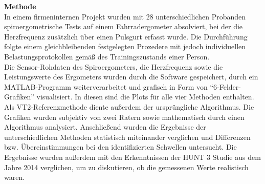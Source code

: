 \textbf{\Large Methode}\\

In einem firmeninternen Projekt wurden mit 28 unterschiedlichen Probanden spiroergometrische Tests auf einem Fahrradergometer absolviert, bei der die Herzfrequenz zusätzlich über einen Pulsgurt erfasst wurde. Die Durchführung folgte einem gleichbleibenden festgelegten Prozedere mit jedoch individuellen Belastungsprotokollen gemäß des Trainingszustands einer Person.\\
Die Sensor-Rohdaten des Spiroergometers, die Herzfrequenz sowie die Leistungswerte des Ergometers wurden durch die Software gespeichert, durch ein MATLAB-Programm weiterverarbeitet und grafisch in Form von "`6-Felder-Grafiken"' visualisiert. In diesen sind die Plots für alle vier Methoden enthalten. Als VT2-Referenzmethode diente außerdem der ursprüngliche Algorithmus. Die Grafiken wurden subjektiv von zwei Ratern sowie mathematisch durch einen Algorithmus analysiert. Anschließend wurden die Ergebnisse der unterschiedlichen Methoden statistisch miteinander verglichen und Differenzen bzw. Übereinstimmungen bei den identifizierten Schwellen untersucht. Die Ergebnisse wurden außerdem mit den Erkenntnissen der HUNT 3 Studie aus dem Jahre 2014 verglichen, um zu diskutieren, ob die gemessenen Werte realistisch waren.